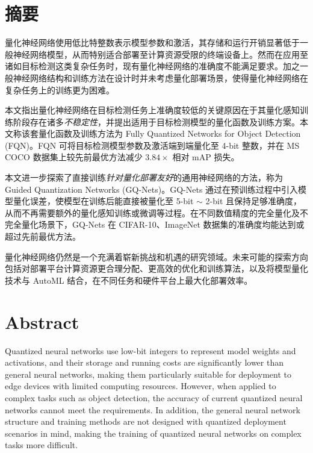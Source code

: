\maketitle%
\MAKETITLE%
\makedeclaration%
\intobmk\chapter*{摘\quad 要}%
\setcounter{page}{1}%
量化神经网络使用低比特整数表示模型参数和激活，其存储和运行开销显著低于一般神经网络模型，从而特别适合部署至计算资源受限的终端设备上。然而在应用至诸如目标检测这类复杂任务时，现有量化神经网络的准确度不能满足要求。加之一般神经网络结构和训练方法在设计时并未考虑量化部署场景，使得量化神经网络在复杂任务上的训练更为困难。

本文指出量化神经网络在目标检测任务上准确度较低的关键原因在于其量化感知训练阶段存在诸多\emph{不稳定性}，并提出适用于目标检测模型的量化函数及训练方案。本文称该套量化函数及训练方法为 Fully Quantized Networks for Object Detection (FQN)。FQN 可将目标检测模型参数及激活端到端量化至 4-bit 整数，并在 MS COCO 数据集上较先前最优方法减少 $3.84\times$ 相对 mAP 损失。

本文进一步探索了直接训练\emph{针对量化部署友好}的通用神经网络的方法，称为 Guided Quantization Networks (GQ-Nets)。GQ-Nets 通过在预训练过程中引入模型量化误差，使模型在训练后能直接被量化至 5-bit $\sim$ 2-bit 且保持足够准确度，从而不再需要额外的量化感知训练或微调等过程。在不同数值精度的完全量化及不完全量化场景下，GQ-Nets 在 CIFAR-10、ImageNet 数据集的准确度均能达到或超过先前最优方法。

量化神经网络仍然是一个充满着崭新挑战和机遇的研究领域。未来可能的探索方向包括对部署平台计算资源更合理分配、更高效的优化和训练算法，以及将模型量化技术与 AutoML 结合，在不同任务和硬件平台上最大化部署效率。

\intobmk\chapter*{Abstract}%
Quantized neural networks use low-bit integers to represent model weights and activations, and their storage and running costs are significantly lower than general neural networks, making them particularly suitable for deployment to edge devices with limited computing resources. However, when applied to complex tasks such as object detection, the accuracy of current quantized neural networks cannot meet the requirements. In addition, the general neural network structure and training methods are not designed with quantized deployment scenarios in mind, making the training of quantized neural networks on complex tasks more difficult.

